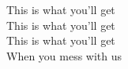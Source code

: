 This is what you'll get \\
This is what you'll get \\
This is what you'll get \\
When you mess with us \\

